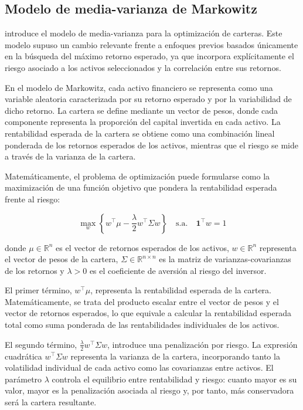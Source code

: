 \subsection{Modelo de media-varianza de Markowitz}

\cite{markowitz1952} introduce el modelo de media-varianza para la optimización de carteras. Este modelo supuso un cambio relevante frente a enfoques previos basados únicamente en la búsqueda del máximo retorno esperado, ya que incorpora explícitamente el riesgo asociado a los activos seleccionados y la correlación entre sus retornos.

En el modelo de Markowitz, cada activo financiero se representa como una variable aleatoria caracterizada por su retorno esperado y por la variabilidad de dicho retorno. La cartera se define mediante un vector de pesos, donde cada componente representa la proporción del capital invertida en cada activo. La rentabilidad esperada de la cartera se obtiene como una combinación lineal ponderada de los retornos esperados de los activos, mientras que el riesgo se mide a través de la varianza de la cartera.

Matemáticamente, el problema de optimización puede formularse como la maximización de una función objetivo que pondera la rentabilidad esperada frente al riesgo:

\begin{equation}
\max_{w} \left\{ w^{\top}\mu - \frac{\lambda}{2} w^{\top}\Sigma w \right\}
\quad \text{s.a.} \quad
\mathbf{1}^{\top}w = 1
\end{equation}

donde $\mu \in \mathbb{R}^n$ es el vector de retornos esperados de los activos, $w \in \mathbb{R}^n$ representa el vector de pesos de la cartera, $\Sigma \in \mathbb{R}^{n \times n}$ es la matriz de varianzas-covarianzas de los retornos y $\lambda > 0$ es el coeficiente de aversión al riesgo del inversor.

El primer término, $w^\top \mu$, representa la rentabilidad esperada de la cartera. Matemáticamente, se trata del producto escalar entre el vector de pesos y el vector de retornos esperados, lo que equivale a calcular la rentabilidad esperada total como suma ponderada de las rentabilidades individuales de los activos.

El segundo término, $\frac{\lambda}{2} w^\top \Sigma w$, introduce una penalización por riesgo. La expresión cuadrática $w^\top \Sigma w$ representa la varianza de la cartera, incorporando tanto la volatilidad individual de cada activo como las covarianzas entre activos. El parámetro $\lambda$ controla el equilibrio entre rentabilidad y riesgo: cuanto mayor es su valor, mayor es la penalización asociada al riesgo y, por tanto, más conservadora será la cartera resultante.

